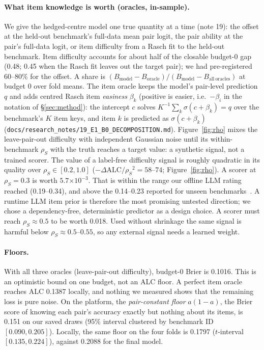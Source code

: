 \documentclass{article}
\newcommand{\dalc}{\ensuremath{\Delta\mathrm{ALC}}}
\newcommand{\ee}[1]{\ensuremath{\times 10^{-#1}}}
\newcommand{\rs}{\ensuremath{\rho_S}}
\begin{document}
\paragraph{What item knowledge is worth (oracles, in-sample).} We give the hedged-centre model one true quantity at
a time (note 19): the offset at the held-out benchmark's full-data mean pair logit, the pair ability at the pair's
full-data logit, or item difficulty from a Rasch fit to the held-out benchmark. Item difficulty accounts for about
half of the closable budget-0 gap (0.48; 0.45 when the Rasch fit leaves out the target pair); we had pre-registered 60--80\% for the offset. A share is $(B_{\mathrm{model}}-B_{\mathrm{oracle}})/(B_{\mathrm{model}}-B_{\mathrm{all\ oracles}})$ at budget 0 over fold means. The item oracle keeps the model's pair-level prediction $q$ and adds centred Rasch item \emph{easiness} $\beta_k$ (positive is easier, i.e.\ $-\beta_i$ in the notation of \S\ref{sec:method}): the intercept $c$ solves $K^{-1}\sum_{k}\sigma(c+\beta_k)=q$ over the benchmark's $K$ item keys, and item $k$ is predicted as $\sigma(c+\beta_k)$ (\texttt{docs/research\_notes/19\_E1\_B0\_DECOMPOSITION.md}). Figure~\ref{fig:rho} mixes the leave-pair-out difficulty with independent Gaussian noise
until its within-benchmark \rs{} with the truth reaches a target value: a synthetic signal, not a trained scorer. The value of a label-free difficulty signal is roughly quadratic in its quality over
$\rs \in [0.2, 1.0]$ ($-\dalc/\rs^2 = 58$--$74$; Figure~\ref{fig:rho}). A scorer at $\rs=0.3$ is worth
$5.7\ee{3}$. That is within the range our offline LLM rating reached (0.19--0.34), and above the 0.14--0.23
reported for unseen benchmarks~\cite{pacchiardi2024}. A runtime LLM item prior is therefore
the most promising untested direction; we chose a dependency-free, deterministic predictor as a design choice. A scorer must reach $\rs\approx0.5$ to be worth 0.018. Used without shrinkage the same signal is harmful below $\rs\approx0.5$--$0.55$, so any external signal needs a learned weight.

\paragraph{Floors.} With all three oracles (leave-pair-out difficulty), budget-0 Brier is 0.1016. This is
an optimistic bound on one budget, not an ALC floor. A perfect item oracle reaches ALC 0.1387 locally, and nothing we
measured shows that the remaining loss is pure noise. On the platform, the \emph{pair-constant floor} $a(1-a)$, the
Brier score of knowing each pair's accuracy exactly but nothing about its items, is 0.151 on our saved draws (95\%
interval clustered by benchmark ID $[0.090, 0.205]$). Locally, the
same floor on the four folds is 0.1797 ($t$-interval $[0.135, 0.224]$), against 0.2088 for the final model.
\end{document}
